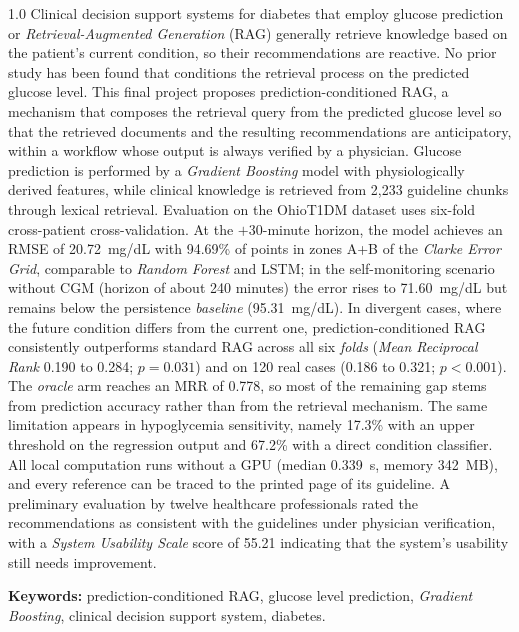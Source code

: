 \begin{spacing}{1.0}
Clinical decision support systems for diabetes that employ glucose prediction or
\emph{Retrieval-Augmented Generation} (RAG) generally retrieve knowledge based on the patient's
current condition, so their recommendations are reactive. No prior study has been found that
conditions the retrieval process on the predicted glucose level. This final project proposes
prediction-conditioned RAG, a mechanism that composes the retrieval query from the predicted
glucose level so that the retrieved documents and the resulting recommendations are anticipatory,
within a workflow whose output is always verified by a physician. Glucose prediction is performed
by a \emph{Gradient Boosting} model with physiologically derived features, while clinical knowledge
is retrieved from 2,233 guideline chunks through lexical retrieval. Evaluation on the OhioT1DM
dataset uses six-fold cross-patient cross-validation. At the $+30$-minute horizon, the model
achieves an RMSE of 20.72~mg/dL with 94.69\% of points in zones A+B of the \emph{Clarke Error
Grid}, comparable to \emph{Random Forest} and LSTM; in the self-monitoring scenario without CGM
(horizon of about 240 minutes) the error rises to 71.60~mg/dL but remains below the persistence
\emph{baseline} (95.31~mg/dL). In divergent cases, where the future condition differs from the
current one, prediction-conditioned RAG consistently outperforms standard RAG across all six
\emph{folds} (\emph{Mean Reciprocal Rank} 0.190 to 0.284; $p=0.031$) and on 120 real cases
(0.186 to 0.321; $p<0.001$). The \emph{oracle} arm reaches an MRR of 0.778, so most of the
remaining gap stems from prediction accuracy rather than from the retrieval mechanism. The same
limitation appears in hypoglycemia sensitivity, namely 17.3\% with an upper threshold on the
regression output and 67.2\% with a direct condition classifier. All local computation runs
without a GPU (median 0.339~s, memory 342~MB), and every reference can be traced to the printed
page of its guideline. A preliminary evaluation by twelve healthcare professionals rated the
recommendations as consistent with the guidelines under physician verification, with a
\emph{System Usability Scale} score of 55.21 indicating that the system's usability still needs
improvement.

\textbf{Keywords:} prediction-conditioned RAG, glucose level prediction, \emph{Gradient Boosting}, clinical decision support system, diabetes.
\end{spacing}
